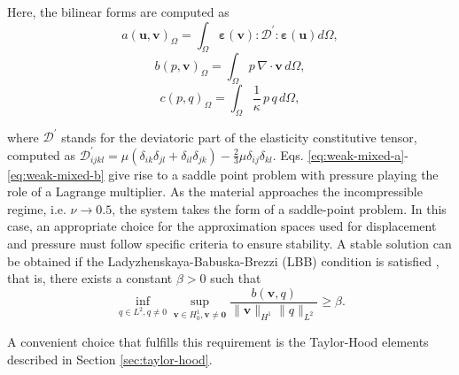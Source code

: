 \documentclass[english,11pt,3p,number,sort&compress]{elsarticle}
\begin{document}
\noindent Here, the bilinear forms are computed as
\begin{equation*}
	a\left(\bm{u},\bm{v}\right)_\Omega = \int_{\Omega} \bm{\varepsilon}(\bm{v}) : \mathcal{D}^{'} : \bm{\varepsilon}(\bm{u}) d\Omega ,
\end{equation*}
\begin{equation*}
	b\left(p, \bm{v}\right)_\Omega = \int_{\Omega} p \,\nabla \cdot \bm{v} \, d\Omega ,
\end{equation*}
\begin{equation*}
	c\left(p,q \right)_\Omega = \int_{\Omega} \frac{1}{\kappa} \,p \,q \, d\Omega ,
\end{equation*}

\noindent where $\mathcal{D}^{'}$ stands for the deviatoric part of the elasticity constitutive tensor, computed as $\mathcal{D}^{'}_{ijkl} = \mu(\delta_{ik}\delta_{jl}+\delta_{il}\delta_{jk})-\frac{2}{3}\mu\delta_{ij}\delta_{kl}$. Eqs. \eqref{eq:weak-mixed-a}-\eqref{eq:weak-mixed-b} give rise to a saddle point problem with pressure playing the role of a Lagrange multiplier. As the material approaches the incompressible regime, i.e. $\nu \rightarrow 0.5$, the system takes the form of a saddle-point problem. In this case, an appropriate choice for the approximation spaces used for displacement and pressure must follow specific criteria to ensure stability. A stable solution can be obtained if the Ladyzhenskaya-Babuska-Brezzi (LBB) condition is satisfied \cite{brezzi2012mixed}, that is, there exists a constant $\beta>0$ such that
\begin{equation} \label{eq:LBB}
	\inf_{q \in L^2,q\neq0} \sup_{\bm{v} \in H^1_0,\bm{v}\neq\bm{0}} \frac{b\left(\bm{v},q\right)}{\|\bm{v}\|_{H^1} \|q\|_{L^2}} \geq \beta .
\end{equation}

\noindent A convenient choice that fulfills this requirement is the Taylor-Hood elements \cite{taylor1973numerical} described in Section \ref{sec:taylor-hood}.
\end{document}
